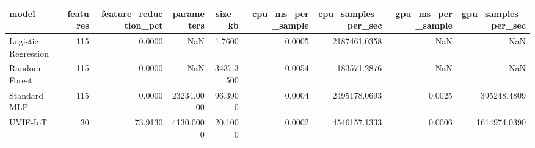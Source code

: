 \begin{tabular}{lrrrrrrrr}
\toprule
model & features & feature_reduction_pct & parameters & size_kb & cpu_ms_per_sample & cpu_samples_per_sec & gpu_ms_per_sample & gpu_samples_per_sec \\
\midrule
Logistic Regression & 115 & 0.0000 & NaN & 1.7600 & 0.0005 & 2187461.0358 & NaN & NaN \\
Random Forest & 115 & 0.0000 & NaN & 3437.3500 & 0.0054 & 183571.2876 & NaN & NaN \\
Standard MLP & 115 & 0.0000 & 23234.0000 & 96.3900 & 0.0004 & 2495178.0693 & 0.0025 & 395248.4809 \\
UVIF-IoT & 30 & 73.9130 & 4130.0000 & 20.1000 & 0.0002 & 4546157.1333 & 0.0006 & 1614974.0390 \\
\bottomrule
\end{tabular}

